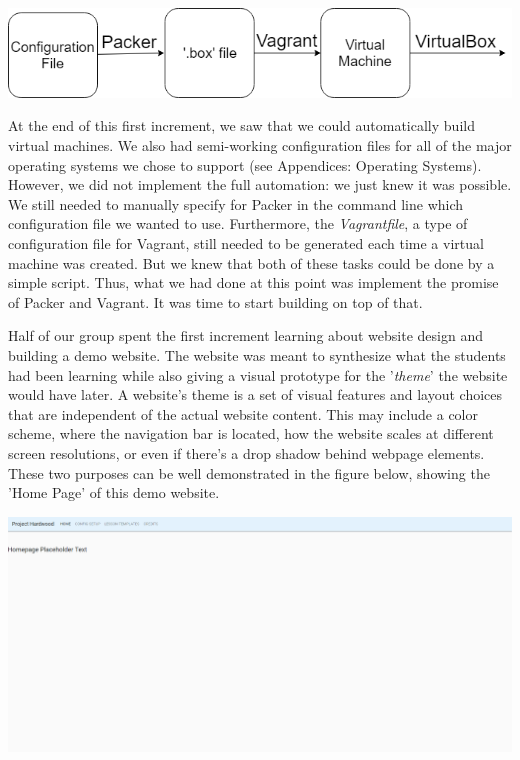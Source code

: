 \documentclass[openright]{report}
\begin{document}
\begin{center}
    \includegraphics[scale=0.64]{images/Proto1.png}
\end{center}

\par At the end of this first increment, we saw that we could automatically build virtual machines. We also had semi-working configuration files for all of the major operating systems we chose to support (see Appendices: Operating Systems). However, we did not implement the full automation: we just knew it was possible. We still needed to manually specify for Packer in the command line which configuration file we wanted to use. Furthermore, the \textit{Vagrantfile}, a type of configuration file for Vagrant, still needed to be generated each time a virtual machine was created. But we knew that both of these tasks could be done by a simple script. Thus, what we had done at this point was implement the promise of Packer and Vagrant. It was time to start building on top of that.

\par Half of our group spent the first increment learning about website design and building a demo website. The website was meant to synthesize what the students had been learning while also giving a visual prototype for the '\textit{theme}' the website would have later. A website's theme is a set of visual features and layout choices that are independent of the actual website content. This may include a color scheme, where the navigation bar is located, how the website scales at different screen resolutions, or even if there's a drop shadow behind webpage elements. These two purposes can be well demonstrated in the figure below, showing the 'Home Page' of this demo website.

\begin{center}
    \includegraphics[scale=0.36]{images/homepage1.png}
\end{center}
\end{document}
